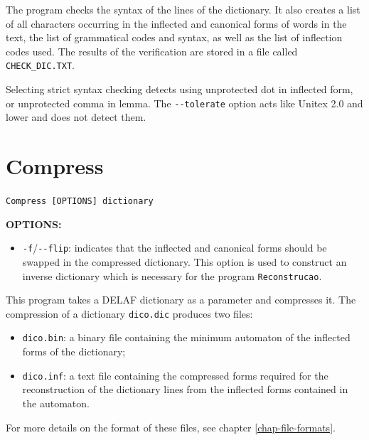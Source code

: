 \bigskip
\noindent The program checks the syntax of the lines of the dictionary. It also creates a
list of all characters occurring in the inflected and canonical forms of words in
the text, the list of grammatical codes and syntax, as well as the list of
inflection codes used. The results of the verification are stored in a file
called \verb+CHECK_DIC.TXT+.

\bigskip
\noindent Selecting strict syntax checking detects using unprotected dot in
inflected form, or unprotected comma in lemma. The \verb+--tolerate+ option acts like Unitex 2.0
and lower and does not detect them.





\section{Compress}
\label{section-compress}
\verb+Compress [OPTIONS] dictionary+

\bigskip
\noindent \textbf{OPTIONS:}
\begin{itemize}
  \item \verb+-f+/\verb+--flip+: indicates
that the inflected and canonical forms should be swapped in the compressed
dictionary. This option is used to construct an inverse dictionary which is
necessary for the program \verb+Reconstrucao+.
\end{itemize}

\bigskip
\noindent This program takes a DELAF dictionary as a parameter and compresses it.
The compression of a dictionary \verb+dico.dic+ produces two files:
\begin{itemize}
  \item \verb+dico.bin+: a binary file containing the minimum automaton of the inflected forms of the dictionary;
  \item \verb+dico.inf+: a text file containing the compressed forms required for the reconstruction of the dictionary
  lines from the inflected forms contained in the automaton.
\end{itemize}

\bigskip
\noindent For more details on the format of these files, see chapter
\ref{chap-file-formats}.






